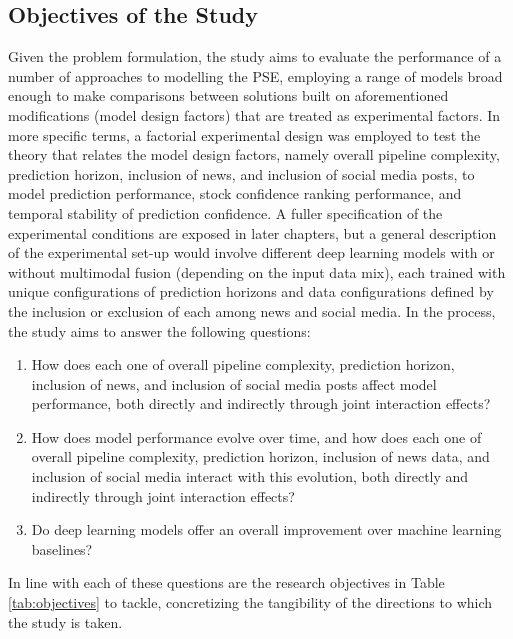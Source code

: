 \documentclass[stu,floatsintext]{apa7}
\begin{document}
\subsection{Objectives of the Study}

Given the problem formulation, the study aims to evaluate the performance of a number of approaches to modelling the PSE, employing a range of models broad enough to make comparisons between solutions built on aforementioned modifications (model design factors) that are treated as experimental factors. In more specific terms, a factorial experimental design was employed to test the theory that relates the model design factors, namely overall pipeline complexity, prediction horizon, inclusion of news, and inclusion of social media posts, to model prediction performance, stock confidence ranking performance, and temporal stability of prediction confidence. A fuller specification of the experimental conditions are exposed in later chapters, but a general description of the experimental set-up would involve different deep learning models with or without multimodal fusion (depending on the input data mix), each trained with unique configurations of prediction horizons and data configurations defined by the inclusion or exclusion of each among news and social media. In the process, the study aims to answer the following questions:

\begin{enumerate}
\item \label{rq:baseline}
How does each one of overall pipeline complexity, prediction horizon, inclusion of news, and inclusion of social media posts affect model performance, both directly and indirectly through joint interaction effects?
\item \label{rq:performance}
How does model performance evolve over time, and how does each one of overall pipeline complexity, prediction horizon, inclusion of news data, and inclusion of social media interact with this evolution, both directly and indirectly through joint interaction effects?
\item \label{rq:drift}
Do deep learning models offer an overall improvement over machine learning baselines?
\end{enumerate}

In line with each of these questions are the research objectives in Table \ref{tab:objectives} to tackle, concretizing the tangibility of the directions to which the study is taken.
\end{document}
